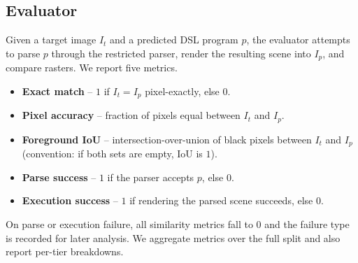 \subsection{Evaluator}
\label{sec:evaluator}

Given a target image $I_t$ and a predicted DSL program $p$, the evaluator
attempts to parse $p$ through the restricted parser, render the resulting scene
into $I_p$, and compare rasters. We report five metrics.

\begin{itemize}
  \item \textbf{Exact match} -- $1$ if $I_t = I_p$ pixel-exactly, else $0$.
  \item \textbf{Pixel accuracy} -- fraction of pixels equal between $I_t$ and $I_p$.
  \item \textbf{Foreground IoU} -- intersection-over-union of black pixels
    between $I_t$ and $I_p$ (convention: if both sets are empty, IoU is $1$).
  \item \textbf{Parse success} -- $1$ if the parser accepts $p$, else $0$.
  \item \textbf{Execution success} -- $1$ if rendering the parsed scene succeeds, else $0$.
\end{itemize}

On parse or execution failure, all similarity metrics fall to $0$ and the
failure type is recorded for later analysis. We aggregate metrics over the full
split and also report per-tier breakdowns.

